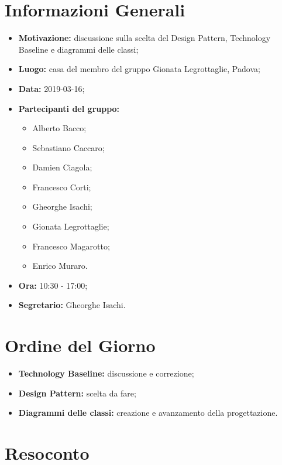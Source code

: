 \documentclass[a4paper, oneside, openany, dvipsnames, table]{article}
\begin{document}
\copertina{}


\newpage
\tableofcontents
\newpage
\section{Informazioni Generali}
\begin{itemize}
\item \textbf{Motivazione:} discussione sulla scelta del Design Pattern, Technology Baseline e diagrammi delle classi;
\item \textbf{Luogo:} casa del membro del gruppo Gionata Legrottaglie, Padova;
\item \textbf{Data:} 2019-03-16;
\item \textbf{Partecipanti del gruppo:} \hfill
	\begin{itemize}
	\item Alberto Bacco;
	\item Sebastiano Caccaro;
	\item Damien Ciagola;
 	\item Francesco Corti;
	\item Gheorghe Isachi;
	\item Gionata Legrottaglie;
	\item Francesco Magarotto;
	\item Enrico Muraro.
	\end{itemize} 
\item \textbf{Ora:} 10:30 - 17:00;
\item \textbf{Segretario:} Gheorghe Isachi.
\end{itemize}

\section{Ordine del Giorno}
\begin{itemize}
\item \textbf{Technology Baseline:} discussione e correzione;
\item \textbf{Design Pattern:} scelta da fare; 
\item \textbf{Diagrammi delle classi:} creazione e avanzamento della progettazione.
\end{itemize}

\section{Resoconto}
\end{document}
